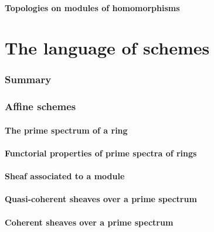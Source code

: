 \documentclass[10pt,oneside]{amsart}
\begin{document}
        \subsection{Topologies on modules of homomorphisms}
        

\clearpage


\setcounter{subsection}{0}
\part{The language of schemes}
    
    \section*{Summary}
    

    \section{Affine schemes}
       
        \subsection{The prime spectrum of a ring}
        
       
        \subsection{Functorial properties of prime spectra of rings}
        
       
        \subsection{Sheaf associated to a module}
        
       
        \subsection{Quasi-coherent sheaves over a prime spectrum}
        
      
        \subsection{Coherent sheaves over a prime spectrum}
        
       
\end{document}
